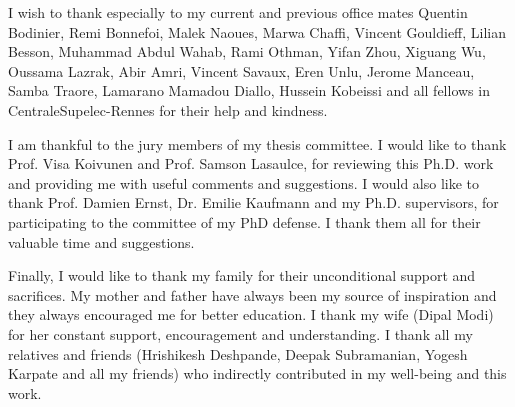 {I wish to thank especially to my current and previous office mates Quentin Bodinier, Remi Bonnefoi, Malek Naoues, Marwa Chaffi, Vincent Gouldieff, Lilian Besson, Muhammad Abdul Wahab, Rami Othman, Yifan Zhou, Xiguang Wu, Oussama Lazrak, Abir Amri, Vincent Savaux, Eren Unlu, Jerome Manceau, Samba Traore, Lamarano Mamadou Diallo, Hussein Kobeissi and all fellows in CentraleSupelec-Rennes for their help and kindness.

I am thankful to the jury members of my thesis committee. I would like to thank Prof. Visa Koivunen and Prof. Samson Lasaulce, for reviewing this Ph.D. work and providing me with useful comments and suggestions. I would also like to thank Prof. Damien Ernst, Dr. Emilie Kaufmann and my Ph.D. supervisors, for participating to the committee of my PhD defense. I thank them all for their valuable time and suggestions.

Finally, I would like to thank my family for their unconditional support and sacrifices. My mother and father have always been my source of inspiration and they always encouraged me for better education. I thank my wife (Dipal Modi) for her constant support, encouragement and understanding. I thank all my relatives and friends (Hrishikesh Deshpande, Deepak Subramanian, Yogesh Karpate and all my friends) who indirectly contributed in my well-being and this work.


}
